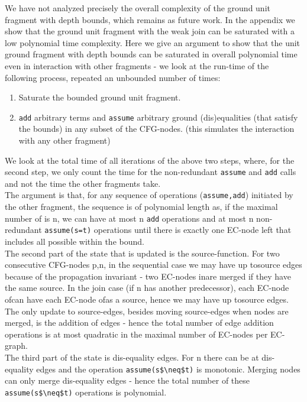 We have not analyzed precisely the overall complexity of the ground unit fragment with depth bounds, which remains as future work.
In the appendix we show that the ground unit fragment with the weak join can be saturated with a low polynomial time complexity.
Here we give an argument to show that the unit ground fragment with depth bounds can be saturated in overall polynomial time even in interaction with other fragments - we look at the run-time of the following process, repeated an unbounded number of times:
\begin{enumerate}
\item Saturate the bounded ground unit fragment.
\item \lstinline|add| arbitrary terms and \lstinline|assume| arbitrary ground (dis)equalities (that satisfy the bounds) in any subset of the CFG-nodes. (this simulates the interaction with any other fragment)
\end{enumerate}
We look at the total time of all iterations of the above two steps, where, for the second step, we only count the time for the non-redundant \lstinline|assume| and \lstinline|add| calls and not the time the other fragments take.\\ 
The argument is that, for any sequence of operations (\lstinline|assume,add|) initiated by the other fragment, the sequence is of polynomial length as, if the maximal number of \GFAs{} is n, we can have at most n \lstinline|add| operations and at most n non-redundant \lstinline|assume(s=t)| operations until there is exactly one EC-node left that includes all possible \GFAs{} within the bound.\\
The second part of the state that is updated is the source-function. For two consecutive CFG-nodes p,n, in the sequential case we may have up tosource edges because of the propagation invariant - two EC-nodes inare merged if they have the same source.
In the join case (if n has another predecessor), each EC-node ofcan have each EC-node ofas a source, hence we may have up tosource edges. The only update to source-edges, besides moving source-edges when nodes are merged, is the addition of edges - hence the total number of edge addition operations is at most quadratic in the maximal number of EC-nodes per EC-graph.\\
The third part of the state is dis-equality edges. For n \GFAs{} there can be at  dis-equality edges and the operation \lstinline|assume(s$\neq$t)| is monotonic. Merging nodes can only merge dis-equality edges - hence the total number of these \lstinline|assume(s$\neq$t)| operations is polynomial.\\
